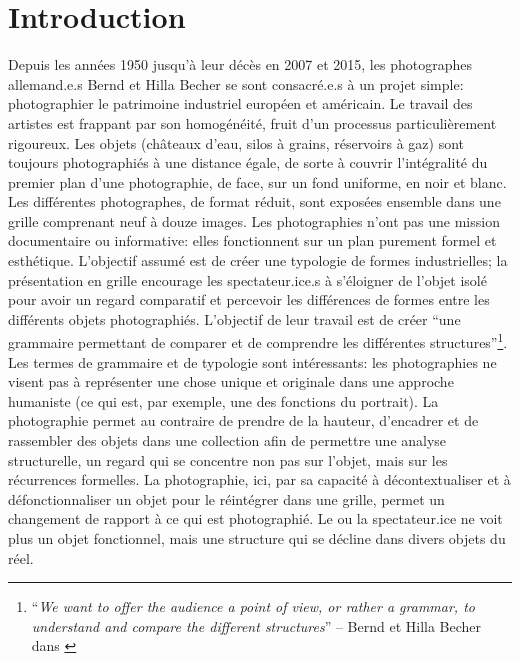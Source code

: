 \chapter*{Introduction}
Depuis les années 1950 jusqu'à leur décès en 2007 et 2015, les photographes allemand.e.s Bernd et Hilla Becher se sont consacré.e.s à un projet simple: photographier le patrimoine industriel européen et américain. Le travail des artistes est frappant par son homogénéité, fruit d'un processus particulièrement rigoureux. Les objets (châteaux d'eau, silos à grains, réservoirs à gaz) sont toujours photographiés à une distance égale, de sorte à couvrir l'intégralité du premier plan d'une photographie, de face, sur un fond uniforme, en noir et blanc. Les différentes photographes, de format réduit, sont exposées ensemble dans une grille comprenant neuf à douze images. Les photographies n'ont pas une mission documentaire ou informative: elles fonctionnent sur un plan purement formel et esthétique. L'objectif assumé est de créer une typologie de formes industrielles; la présentation en grille encourage les spectateur.ice.s à s'éloigner de l'objet isolé pour avoir un regard comparatif et percevoir les différences de formes entre les différents objets photographiés. L'objectif de leur travail est de créer \enquote{une grammaire permettant de comparer et de comprendre les différentes structures}\footnote{
	\enquote{\textit{We want to offer the audience a point of view, or rather a grammar, to understand and compare the different structures}} -- Bernd et Hilla Becher dans \cite{stimson_photographic_2004}
}. Les termes de grammaire et de typologie sont intéressants: les photographies ne visent pas à représenter une chose unique et originale dans une approche humaniste (ce qui est, par exemple, une des fonctions du portrait). La photographie permet au contraire de prendre de la hauteur, d'encadrer et de rassembler des objets dans une collection afin de permettre une analyse structurelle, un regard qui se concentre non pas sur l'objet, mais sur les récurrences formelles. La photographie, ici, par sa capacité à décontextualiser et à défonctionnaliser un objet pour le réintégrer dans une grille, permet un changement de rapport à ce qui est photographié. Le ou la spectateur.ice ne voit plus un objet fonctionnel, mais une structure qui se décline dans divers objets du réel.

